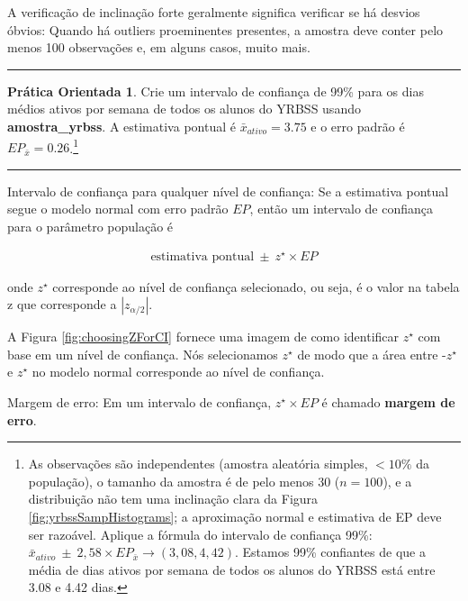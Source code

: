 \documentclass[
]{book}
\theoremstyle{definition}
\theoremstyle{definition}
\theoremstyle{definition}
\newtheorem{exercise}{Prática Orientada}[chapter]
\theoremstyle{definition}
\theoremstyle{remark}
\begin{document}
A verificação de inclinação forte geralmente significa verificar se há desvios óbvios: Quando há outliers proeminentes presentes, a amostra deve conter pelo menos 100 observações e, em alguns casos, muito mais.

\begin{center}\rule{0.5\linewidth}{0.5pt}\end{center}

\begin{exercise}
\protect\hypertarget{exr:po10}{}{\label{exr:po10} }Crie um intervalo de confiança de 99\% para os dias médios ativos por semana de todos os alunos do YRBSS usando \textbf{amostra\_yrbss}. A estimativa pontual é \(\bar{x}_{ativo} = 3.75\) e o erro padrão é \(EP_{\bar{x}} = 0.26\).\footnote{As observações são independentes (amostra aleatória simples, \(<10\%\) da população), o tamanho da amostra é de pelo menos 30 (\(n = 100\)), e a distribuição não tem uma inclinação clara da Figura \ref{fig:yrbssSampHistograms}; a aproximação normal e estimativa de EP deve ser razoável. Aplique a fórmula do intervalo de confiança 99\%: \(\bar{x}_{ativo}\ \pm\ 2,58 \times EP_{\bar{x}} \rightarrow (3,08, 4,42)\). Estamos 99\% confiantes de que a média de dias ativos por semana de todos os alunos do YRBSS está entre 3.08 e 4.42 dias.}
\end{exercise}

\begin{center}\rule{0.5\linewidth}{0.5pt}\end{center}

Intervalo de confiança para qualquer nível de confiança: Se a estimativa pontual segue o modelo normal com erro padrão \(EP\), então um intervalo de confiança para o parâmetro população é

\begin{eqnarray*}
\text{estimativa pontual}\ \pm\ z^{\star} \times EP
\end{eqnarray*}

onde \(z^{\star}\) corresponde ao nível de confiança selecionado, ou seja, é o valor na tabela z que corresponde a \(|z_{\alpha/2}|\).

A Figura \ref{fig:choosingZForCI} fornece uma imagem de como identificar \(z^{\star}\) com base em um nível de confiança. Nós selecionamos \(z^{\star}\) de modo que a área entre -\(z^{\star}\) e \(z^{\star}\) no modelo normal corresponde ao nível de confiança.

Margem de erro: Em um intervalo de confiança, \(z^{\star}\times EP\) é chamado \textbf{margem de erro}.
\end{document}
